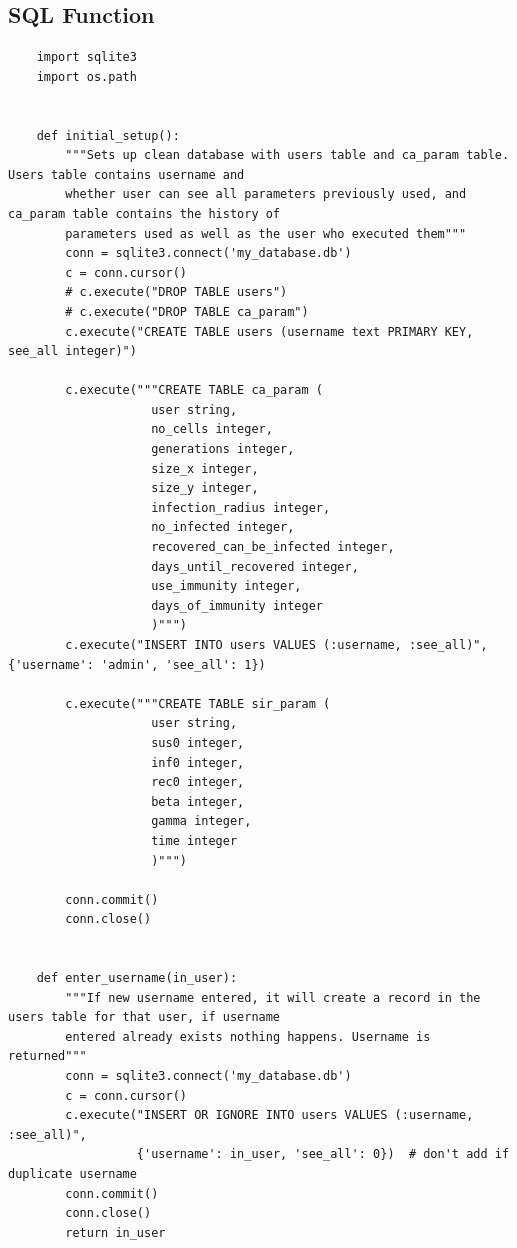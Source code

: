 \documentclass[11pt, a4paper]{article}
\begin{document}
\subsection{SQL Function}
\begin{lstlisting}
    import sqlite3
    import os.path
    
    
    def initial_setup():
        """Sets up clean database with users table and ca_param table. Users table contains username and
        whether user can see all parameters previously used, and ca_param table contains the history of
        parameters used as well as the user who executed them"""
        conn = sqlite3.connect('my_database.db')
        c = conn.cursor()
        # c.execute("DROP TABLE users")
        # c.execute("DROP TABLE ca_param")
        c.execute("CREATE TABLE users (username text PRIMARY KEY, see_all integer)")
    
        c.execute("""CREATE TABLE ca_param (
                    user string,
                    no_cells integer,
                    generations integer,
                    size_x integer,
                    size_y integer,
                    infection_radius integer,
                    no_infected integer,
                    recovered_can_be_infected integer,
                    days_until_recovered integer,
                    use_immunity integer,
                    days_of_immunity integer    
                    )""")
        c.execute("INSERT INTO users VALUES (:username, :see_all)", {'username': 'admin', 'see_all': 1})
    
        c.execute("""CREATE TABLE sir_param (
                    user string,
                    sus0 integer,
                    inf0 integer,
                    rec0 integer,
                    beta integer,
                    gamma integer,
                    time integer
                    )""")
    
        conn.commit()
        conn.close()
    
    
    def enter_username(in_user):
        """If new username entered, it will create a record in the users table for that user, if username
        entered already exists nothing happens. Username is returned"""
        conn = sqlite3.connect('my_database.db')
        c = conn.cursor()
        c.execute("INSERT OR IGNORE INTO users VALUES (:username, :see_all)",
                  {'username': in_user, 'see_all': 0})  # don't add if duplicate username
        conn.commit()
        conn.close()
        return in_user
    

\end{lstlisting}
\end{document}
